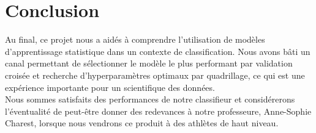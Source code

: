 \section{Conclusion}
Au final, ce projet nous a aidés à comprendre l’utilisation de modèles d’apprentissage statistique dans un contexte de classification. Nous avons bâti un canal permettant de sélectionner le modèle le plus performant par validation croisée et recherche d’hyperparamètres optimaux par quadrillage, ce qui est une expérience importante pour un scientifique des données.\\

Nous sommes satisfaits des performances de notre classifieur et considérerons l'éventualité de peut-être donner des redevances à notre professeure, Anne-Sophie Charest, lorsque nous vendrons ce produit à des athlètes de haut niveau.